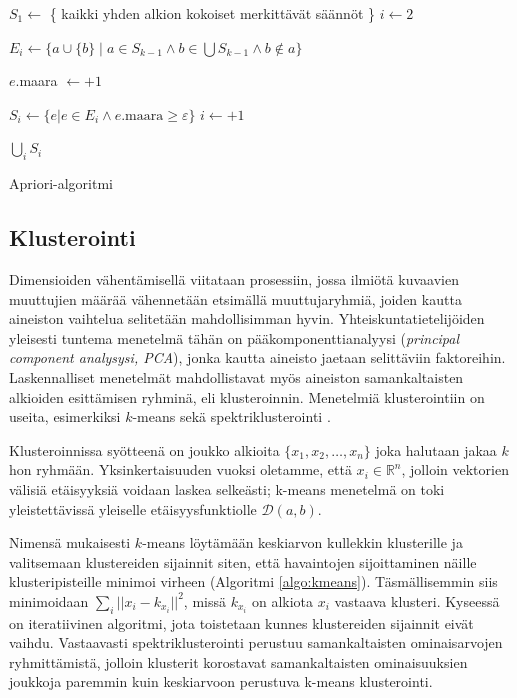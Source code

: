 \documentclass[finnish,gradu,twoside,12pt]{tktltiki}
\begin{document}
{\begin{algorithm}
\begin{algorithmic}
\State $S_1 \gets $ \{ kaikki yhden alkion kokoiset merkittävät säännöt \}
\State $i \gets 2$


  \State $E_i \gets \{ a \cup \{b\} \mid a \in S_{k-1} \land b \in \bigcup S_{k-1} \land b \not \in a \} $

		   \State $e$.maara $ \gets + 1$
		\EndFor

	\EndFor 

		\State $S_i \gets \{ e | e \in E_i \land e.\mathrm{maara} \geq \varepsilon \}$
		\State $i \gets +1$
\EndWhile

\Return $\bigcup_i S_i$
\end{algorithmic}
\caption{Apriori-algoritmi}
\label{algo:apriori}
\end{algorithm}


\subsection{Klusterointi}

Dimensioiden vähentämisellä viitataan prosessiin, jossa ilmiötä kuvaavien muuttujien määrää vähennetään etsimällä muuttujaryhmiä, joiden kautta aineiston vaihtelua selitetään mahdollisimman hyvin. Yhteiskuntatietelijöiden yleisesti tuntema menetelmä tähän on pääkomponenttianalyysi (\textit{principal component analysysi, PCA}), jonka kautta aineisto jaetaan selittäviin faktoreihin. Laskennalliset menetelmät mahdollistavat myös aineiston samankaltaisten alkioiden esittämisen ryhminä, eli klusteroinnin. Menetelmiä klusterointiin on useita, esimerkiksi $k$-means sekä spektriklusterointi \citep[485--586]{Hastie2009}.

Klusteroinnissa syötteenä on joukko alkioita $\{ x_1, x_2, \ldots, x_n \}$ joka halutaan jakaa $k$hon ryhmään. Yksinkertaisuuden vuoksi oletamme, että $x_i \in \mathbb{R}^n$, jolloin vektorien välisiä etäisyyksiä voidaan laskea selkeästi; k-means menetelmä on toki yleistettävissä yleiselle etäisyysfunktiolle $\mathcal{D}(a,b)$.

Nimensä mukaisesti $k$-means löytämään keskiarvon kullekkin klusterille ja valitsemaan klustereiden sijainnit siten, että havaintojen sijoittaminen näille klusteripisteille minimoi virheen (Algoritmi \ref{algo:kmeans}). Täsmällisemmin siis minimoidaan $\sum_i ||x_i - k_{x_i}||^2$, missä $k_{x_i}$ on alkiota $x_i$ vastaava klusteri. Kyseessä on iteratiivinen algoritmi, jota toistetaan kunnes klustereiden sijainnit eivät vaihdu. Vastaavasti spektriklusterointi perustuu samankaltaisten ominaisarvojen ryhmittämistä, jolloin klusterit korostavat samankaltaisten ominaisuuksien joukkoja paremmin kuin keskiarvoon perustuva k-means klusterointi.


}
\end{document}
